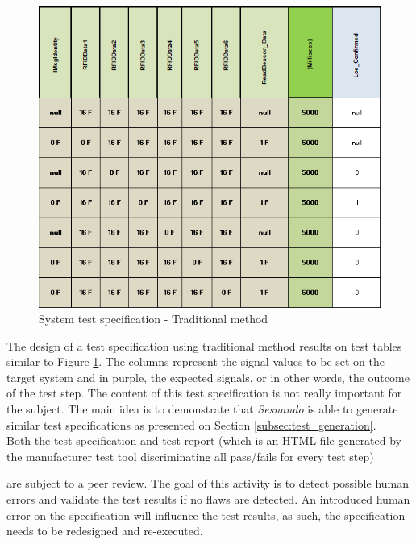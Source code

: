 \begin{figure}[h]
    \centering
    \includegraphics[width=\textwidth]{images/traditional_test_spec.PNG}
    \caption{System test specification - Traditional method}
    \label{fig:system_test_spec}
\end{figure}

The design of a test specification using traditional method results on test tables similar to Figure \ref{fig:system_test_spec}. The columns represent the signal values to be set on the target system and in purple, the expected signals, or in other words, the outcome of the test step. The content of this test specification is not really important for the subject. The main idea is to demonstrate that \textit{Sesnando} is able to generate similar test specifications as presented on Section \ref{subsec:test_generation}.\\

Both the test specification and test report (which is an HTML file generated by the manufacturer test tool discriminating all pass/fails for every test step) 

are subject to a peer review. The goal of this activity is to detect possible human errors and validate the test results if no flaws are detected. An introduced human error on the specification will influence the test results, as such, the specification needs to be redesigned and re-executed.\\

